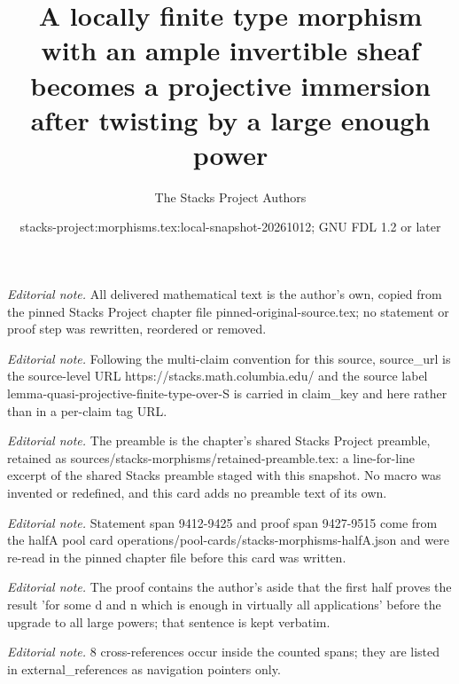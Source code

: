 \documentclass[10pt,a4paper]{amsart}
\title{A locally finite type morphism with an ample invertible sheaf becomes a projective immersion after twisting by a large enough power}
\author{The Stacks Project Authors}
\date{stacks-project:morphisms.tex:local-snapshot-20261012; GNU FDL 1.2 or later}
\theoremstyle{plain}
\theoremstyle{definition}
\theoremstyle{remark}
\numberwithin{equation}{subsection}
\begin{document}
\maketitle
\noindent\textit{Editorial note.} All delivered mathematical text is the author's own, copied from the pinned Stacks Project chapter file pinned-original-source.tex; no statement or proof step was rewritten, reordered or removed.\par\medskip
\noindent\textit{Editorial note.} Following the multi-claim convention for this source, source\_url is the source-level URL https://stacks.math.columbia.edu/ and the source label lemma-quasi-projective-finite-type-over-S is carried in claim\_key and here rather than in a per-claim tag URL.\par\medskip
\noindent\textit{Editorial note.} The preamble is the chapter's shared Stacks Project preamble, retained as sources/stacks-morphisms/retained-preamble.tex: a line-for-line excerpt of the shared Stacks preamble staged with this snapshot. No macro was invented or redefined, and this card adds no preamble text of its own.\par\medskip
\noindent\textit{Editorial note.} Statement span 9412-9425 and proof span 9427-9515 come from the halfA pool card operations/pool-cards/stacks-morphisms-halfA.json and were re-read in the pinned chapter file before this card was written.\par\medskip
\noindent\textit{Editorial note.} The proof contains the author's aside that the first half proves the result 'for some d and n which is enough in virtually all applications' before the upgrade to all large powers; that sentence is kept verbatim.\par\medskip
\noindent\textit{Editorial note.} 8 cross-references occur inside the counted spans; they are listed in external\_references as navigation pointers only.\par\medskip
\end{document}
